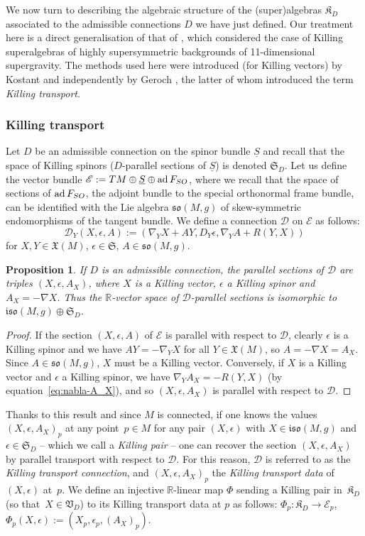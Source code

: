 \documentclass[11pt]{article}
\numberwithin{equation}{section}
\numberwithin{equation}{section}
\newtheorem{Proposition}[Theorem]{Proposition}
 { \theoremstyle{definition}
\newtheorem{Definition}[Theorem]{Definition}
\newtheorem{Note}[Theorem]{Note}
\newtheorem{Example}[Theorem]{Example}
\newtheorem{Remark}[Theorem]{Remark} }
\newcommand{\fso}{\mathfrak{so}}
\newcommand{\fiso}{\mathfrak{iso}}
\newcommand{\fX}{\mathfrak{X}}
\newcommand{\fK}{\mathfrak{K}}
\newcommand{\fS}{\mathfrak{S}}
\newcommand{\fV}{\mathfrak{V}}
\newcommand{\RR}{\mathbb{R}}
\newcommand{\eD}{\mathscr{D}}
\newcommand{\eE}{\mathscr{E}}
\newcommand{\Sbundle}{\underline{S}}
\newcommand{\1}{\mathbbm{1}}
\DeclareMathOperator{\ad}{ad}
\begin{document}
We now turn to describing the algebraic structure of the (super)algebras $\fK_D$ associated to the admissible connections $D$ we have just defined. Our treatment here is a direct generalisation of that of \cite{Figueroa-OFarrill2017_1}, which considered the case of Killing superalgebras of highly supersymmetric backgrounds of 11-dimensional supergravity. The methods used here were introduced (for Killing vectors) by Kostant \cite{Kostant1955} and independently by Geroch \cite{Geroch1969}, the latter of whom introduced the term \emph{Killing transport}.

\subsubsection{Killing transport}

Let $D$ be an admissible connection on the spinor bundle $\Sbundle$ and recall that the space of Killing spinors ($D$-parallel sections of $\Sbundle$) is denoted $\fS_D$. Let us define the vector bundle
$\eE := TM\oplus\Sbundle\oplus\ad F_{\rm SO}$,
where we recall that the space of sections of $\ad F_{\rm SO}$, the adjoint bundle to the special orthonormal frame bundle, can be identified with the Lie algebra $\fso(M,g)$ of skew-symmetric endomorphisms of the tangent bundle. We define a connection $\eD$ on $\eE$ as follows:
\[
	\eD_Y(X,\epsilon,A) := (\nabla_Y X + AY,D_Y\epsilon,\nabla_Y A + R(Y,X))
\]
for $X,Y\in\fX(M)$, $\epsilon\in\fS$, $A\in\fso(M,g)$.

\begin{Proposition}\label{prop:killing-transport}
	If $D$ is an admissible connection, the parallel sections of $\eD$ are triples $(X,\epsilon,A_X)$, where $X$ is a Killing vector, $\epsilon$ a Killing spinor and $A_X=-\nabla X$. Thus the $\RR$-vector space of $\eD$-parallel sections is isomorphic to $\fiso(M,g)\oplus\fS_D$.
\end{Proposition}
\begin{proof}
If the section $(X,\epsilon,A)$ of $\eE$ is parallel with respect to $\eD$, clearly $\epsilon$ is a Killing spinor and we have $AY = -\nabla_Y X$ for all $Y\in\fX(M)$, so $A = -\nabla X = A_X$. Since $A\in\fso(M,g)$, $X$ must be a Killing vector. Conversely, if $X$ is a Killing vector and $\epsilon$ a Killing spinor, we have $\nabla_Y A_X = -R(Y,X)$ (by equation~\eqref{eq:nabla-A_X}), and so $(X,\epsilon,A_X)$ is parallel with respect to $\eD$.
\end{proof}

Thanks to this result and since $M$ is connected, if one knows the values $(X,\epsilon,A_X)_p$ at any point~${p\in M}$ for any pair $(X,\epsilon)$ with $X\in\fiso(M,g)$ and $\epsilon\in\fS_D$ -- which we call a \emph{Killing pair} -- one can recover the section $(X,\epsilon,A_X)$ by parallel transport with respect to $\eD$. For this reason, $\eD$ is referred to as the \emph{Killing transport connection}, and $(X,\epsilon,A_X)_p$ the \emph{Killing transport data} of~$(X,\epsilon)$ at~$p$. We define an injective $\RR$-linear map $\Phi$ sending a Killing pair in~$\fK_D$ (so that~${X\in\fV_D}$) to its Killing transport data at $p$ as follows:
$\Phi_p\colon \fK_D\to\eE_p$,
	$\Phi_p(X,\epsilon):=(X_p,\epsilon_p,(A_X)_p)$.
\end{document}
